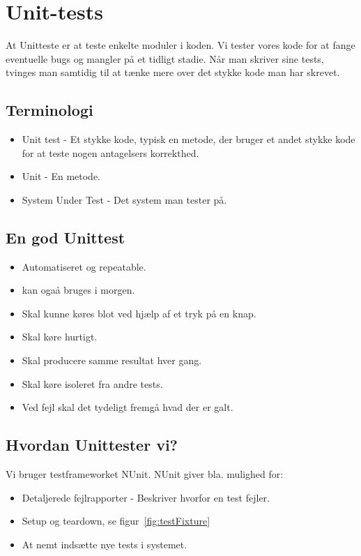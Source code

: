 \section{Unit-tests}
At Unitteste er at teste enkelte moduler i koden. Vi tester vores kode for at fange eventuelle bugs og mangler på et tidligt stadie. Når man skriver sine tests, tvinges man samtidig til at tænke mere over det stykke kode man har skrevet.

\subsection{Terminologi}
\begin{itemize}
	\item Unit test - Et stykke kode, typisk en metode, der bruger et andet stykke kode for at teste nogen antagelsers korrekthed.
	\item Unit - En metode.
	\item System Under Test - Det system man tester på.
\end{itemize}

\subsection{En god Unittest}
\begin{itemize}
	\item Automatiseret og repeatable.
	\item kan ogaå bruges i morgen.
	\item Skal kunne køres blot ved hjælp af et tryk på en knap.
	\item Skal køre hurtigt.
	\item Skal producere samme resultat hver gang.
	\item Skal køre isoleret fra andre tests.
	\item Ved fejl skal det tydeligt fremgå hvad der er galt.
\end{itemize}

\subsection{Hvordan Unittester vi?}

Vi bruger testframeworket NUnit. NUnit giver bla. mulighed for:

\begin{itemize}
	\item Detaljerede fejlrapporter - Beskriver hvorfor en test fejler.
	\item Setup og teardown, se figur~\ref{fig:testFixture}
	\item At nemt indsætte nye tests i systemet.
\end{itemize}

